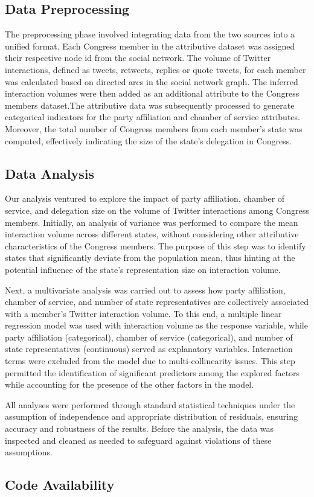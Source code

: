 \documentclass[11pt]{article}
\begin{document}
\subsection*{Data Preprocessing}
The preprocessing phase involved integrating data from the two sources into a unified format. Each Congress member in the attributive dataset was assigned their respective node id from the social network. The volume of Twitter interactions, defined as tweets, retweets, replies or quote tweets, for each member was calculated based on directed arcs in the social network graph. The inferred interaction volumes were then added as an additional attribute to the Congress members dataset.The attributive data was subsequently processed to generate categorical indicators for the party affiliation and chamber of service attributes. Moreover, the total number of Congress members from each member's state was computed, effectively indicating the size of the state's delegation in Congress.

\subsection*{Data Analysis}
Our analysis ventured to explore the impact of party affiliation, chamber of service, and delegation size on the volume of Twitter interactions among Congress members. Initially, an analysis of variance was performed to compare the mean interaction volume across different states, without considering other attributive characteristics of the Congress members. The purpose of this step was to identify states that significantly deviate from the population mean, thus hinting at the potential influence of the state's representation size on interaction volume.

Next, a multivariate analysis was carried out to assess how party affiliation, chamber of service, and number of state representatives are collectively associated with a member's Twitter interaction volume. To this end, a multiple linear regression model was used with interaction volume as the response variable, while party affiliation (categorical), chamber of service (categorical), and number of state representatives (continuous) served as explanatory variables. Interaction terms were excluded from the model due to multi-collinearity issues. This step permitted the identification of significant predictors among the explored factors while accounting for the presence of the other factors in the model.

All analyses were performed through standard statistical techniques under the assumption of independence and appropriate distribution of residuals, ensuring accuracy and robustness of the results. Before the analysis, the data was inspected and cleaned as needed to safeguard against violations of these assumptions.\subsection*{Code Availability}
\end{document}
